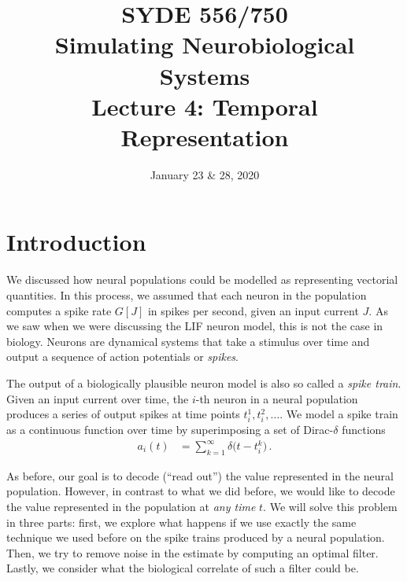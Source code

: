 \documentclass[10pt,letterpaper,oneside]{article}
\date{January 23 \& 28, 2020}
\title{SYDE 556/750 \\ Simulating Neurobiological Systems \\ Lecture 4: Temporal Representation}
\begin{document}

\section{Introduction}


We discussed how neural populations could be modelled as representing vectorial quantities. In this process, we assumed that each neuron in the population computes a spike rate $G[J]$ in spikes per second, given an input current $J$. As we saw when we were discussing the LIF neuron model, this is not the case in biology. Neurons are dynamical systems that take a stimulus over time and output a sequence of action potentials or \emph{spikes}.

The output of a biologically plausible neuron model is also so called a \emph{spike train}. Given an input current over time, the $i$-th neuron in a neural population produces a series of output spikes at time points $t^1_i, t^2_i, \ldots$. We model a spike train as a continuous function over time by superimposing a set of Dirac-$\delta$ functions
\begin{align*}
	a_i(t) &= \sum_{k = 1}^\infty \delta\big(t - t^k_i\big) \,.
\end{align*}


As before, our goal is to decode (\enquote{read out}) the value represented in the neural population. However, in contrast to what we did before, we would like to decode the value represented in the population at \emph{any time} $t$. We will solve this problem in three parts: first, we explore what happens if we use exactly the same technique we used before on the spike trains produced by a neural population. Then, we try to remove noise in the estimate by computing an optimal filter. Lastly, we consider what the biological correlate of such a filter could be.
\end{document}
